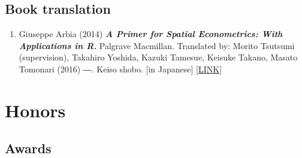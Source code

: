 \documentclass[
]{book}
\providecommand{\tightlist}{%
  \setlength{\itemsep}{0pt}\setlength{\parskip}{0pt}}
\begin{document}
\section*{Book translation}\label{book-translation}

\begin{enumerate}
\def\labelenumi{\arabic{enumi}.}
\tightlist
\item
  Giuseppe Arbia (2014)
  \textbf{\emph{A Primer for Spatial Econometrics: With Applications in R.}} Palgrave Macmillan.
  Translated by: Morito Tsutsumi (supervision), Takahiro Yoshida, Kazuki Tamesue, Keisuke Takano, Masato Tomonari (2016) ―. Keiso shobo.
  {[}in Japanese{]} {[}\href{http://www.keisoshobo.co.jp/book/b222571.html}{LINK}{]}
\end{enumerate}

\chapter*{Honors}\label{honors}

\section*{Awards}\label{awards}
\end{document}
